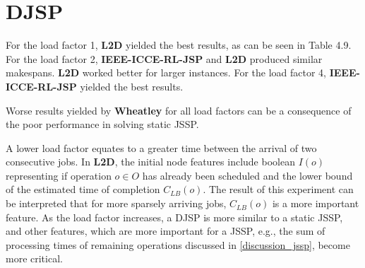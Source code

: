 \section{DJSP}
For the load factor 1, \textbf{L2D} yielded the best results, as can be seen in Table 4.9. For the load factor 2, \textbf{IEEE-ICCE-RL-JSP} and \textbf{L2D} produced similar makespans. \textbf{L2D} worked better for larger instances. For the load factor 4, \textbf{IEEE-ICCE-RL-JSP} yielded the best results. 
\par
Worse results yielded by \textbf{Wheatley} for all load factors can be a consequence of the poor performance in solving static JSSP.
\par
A lower load factor equates to a greater time between the arrival of two consecutive jobs. In \textbf{L2D}, the initial node features include boolean $I(o)$ representing if operation $o \in O$ has already been scheduled and the lower bound of the estimated time of completion $C_{LB}(o)$. The result of this experiment can be interpreted that for more sparsely arriving jobs, $C_{LB}(o)$ is a more important feature. As the load factor increases, a DJSP is more similar to a static JSSP, and other features, which are more important for a JSSP, e.g., the sum of processing times of remaining operations discussed in \ref{discussion_jssp}, become more critical.

